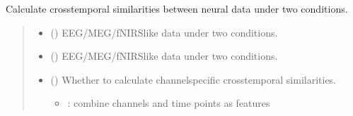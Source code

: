 \documentclass[letterpaper,10pt,english]{sphinxhowto}
\begin{document}
\begin{fulllineitems}
\label{\detokenize{ctcorr_cal:neurora.ctcorr_cal.ctsim_cal}}
\pysigstartsignatures
{}
\pysigstopsignatures
\sphinxAtStartPar
Calculate cross\sphinxhyphen{}temporal similarities between neural data under two conditions.
\begin{quote}\begin{description}
\begin{itemize}
\item {} 
\sphinxAtStartPar
{} (\sphinxstyleliteralemphasis{\sphinxupquote{, }}\sphinxstyleliteralemphasis{\sphinxupquote{ {[}}}\sphinxstyleliteralemphasis{\sphinxupquote{, }}\sphinxstyleliteralemphasis{\sphinxupquote{, }}\sphinxstyleliteralemphasis{\sphinxupquote{{]}}}) \textendash{} EEG/MEG/fNIRS\sphinxhyphen{}like data under two conditions.

\item {} 
\sphinxAtStartPar
{} (\sphinxstyleliteralemphasis{\sphinxupquote{, }}\sphinxstyleliteralemphasis{\sphinxupquote{ {[}}}\sphinxstyleliteralemphasis{\sphinxupquote{, }}\sphinxstyleliteralemphasis{\sphinxupquote{, }}\sphinxstyleliteralemphasis{\sphinxupquote{{]}}}) \textendash{} EEG/MEG/fNIRS\sphinxhyphen{}like data under two conditions.

\item {} 
\sphinxAtStartPar
{} (\sphinxstyleliteralemphasis{\sphinxupquote{, }}) \textendash{} 
\sphinxAtStartPar
Whether to calculate channel\sphinxhyphen{}specific cross\sphinxhyphen{}temporal similarities.
\begin{itemize}
\item {} 
 : combine channels and time points as features


\end{itemize}
\end{itemize}
\end{description}
\end{quote}
\end{fulllineitems}
\end{document}

